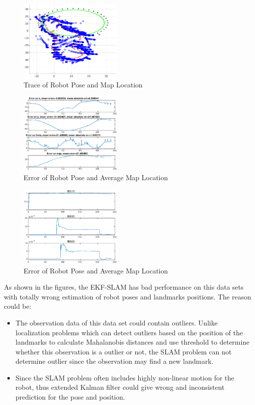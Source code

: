 \documentclass[conference]{IEEEtran}
\begin{document}
\begin{itemize}
\begin{figure}[htbp]
					\centering
					\includegraphics[width=0.45\textwidth]{map_pent_big_40+Trace.eps}
					\caption{Trace of Robot Pose and Map Location}
					\label{fig:map_pent_big_40+Trace}
				\end{figure}
				\begin{figure}[htbp]
					\centering
					\includegraphics[width=0.45\textwidth]{map_pent_big_40+Error.eps}
					\caption{Error of Robot Pose and Average Map Location}
					\label{fig:map_pent_big_40+Error}
				\end{figure}
				\begin{figure}[htbp]
					\centering
					\includegraphics[width=0.45\textwidth]{map_pent_big_40+Variance.eps}
					\caption{Error of Robot Pose and Average Map Location}
					\label{fig:map_pent_big_40+Variance}
				\end{figure}
			\par As shown in the figures, the EKF-SLAM has bad performance on this data sets with totally wrong estimation of robot poses and landmarks positions. The reason could be:
				\begin{itemize}
					\item The observation data of this data set could contain outliers. Unlike localization problems which can detect outliers based on the position of the landmarks to calculate Mahalanobis distances and use threshold to determine whether this observation is a outlier or not, the SLAM problem can not determine outlier since the observation may find a new landmark.
					\item Since the SLAM problem often includes highly non-linear motion for the robot, thus extended Kalman filter could give wrong and inconsistent prediction for the pose and position.
				\end{itemize}
	\end{itemize}
\end{document}
